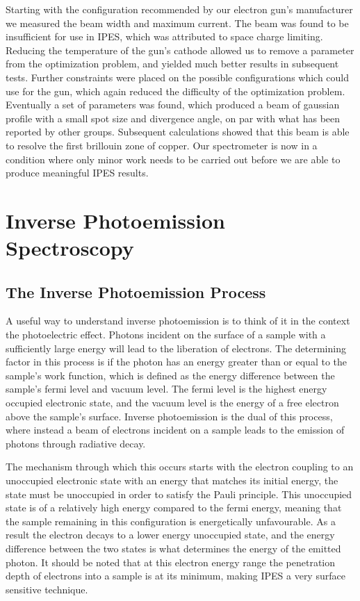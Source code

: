     Starting with the configuration recommended by our electron gun's manufacturer we measured the beam width and maximum current. The beam was found 
    to be insufficient for use in IPES, which was attributed to space charge limiting. Reducing the temperature of the gun's cathode allowed us 
    to remove a parameter from the optimization problem, and yielded much better results in subsequent tests. Further constraints were placed on the 
    possible configurations which could use for the gun, which again reduced the difficulty of the optimization problem. Eventually a set of parameters 
    was found, which produced a beam of gaussian profile with a small spot size and divergence angle, on par with what has been reported by other groups\cite{ipes,raj2004optimization,stoffel1985low,budke}.
    Subsequent calculations showed that this beam is able to resolve the first brillouin zone of copper. Our spectrometer is now in a condition where 
    only minor work needs to be carried out before we are able to produce meaningful IPES results.


\section{Inverse Photoemission Spectroscopy}

\subsection{The Inverse Photoemission Process}

A useful way to understand inverse photoemission is to think of it in the context the photoelectric effect. Photons incident on the surface of a sample with a sufficiently
large energy will lead to the liberation of electrons. The determining factor in this process is if the photon has an energy greater than or equal to the sample's work function, which 
is defined as the energy difference between the sample's fermi level and vacuum level. The fermi level is the highest energy occupied electronic state, and the 
vacuum level is the energy of a free electron above the sample's surface. Inverse photoemission is the dual of this process, where instead a beam of electrons incident on a sample 
leads to the emission of photons through radiative decay. 

The mechanism through which this occurs starts with the electron coupling to an unoccupied electronic state with an energy that matches its initial energy, the state must be unoccupied in 
order to satisfy the Pauli principle. This unoccupied state is of a relatively high energy compared to the fermi energy, meaning that the sample remaining in this configuration 
is energetically unfavourable. As a result the electron decays to a lower energy unoccupied state, and the energy difference between the two states is what determines the energy of 
the emitted photon. It should be noted that at this electron energy range the penetration depth of electrons into a sample is at its minimum\cite{penn1987electron},
making IPES a very surface sensitive technique.

